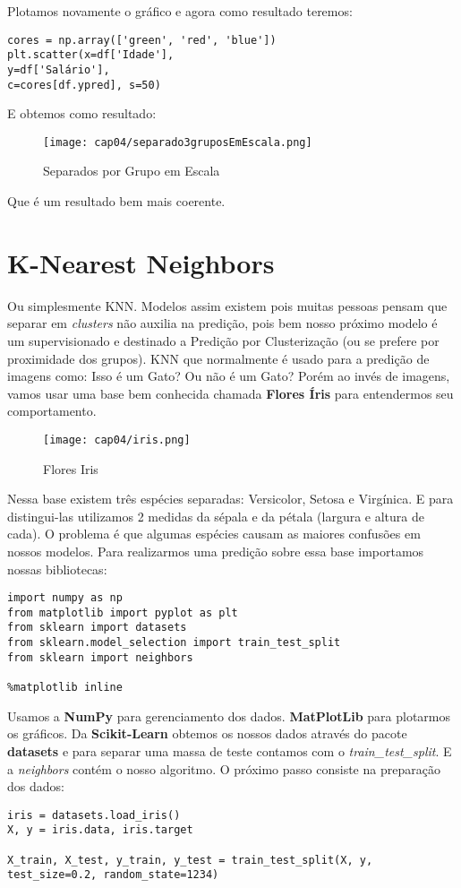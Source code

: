 Plotamos novamente o gráfico e agora como resultado teremos:
\begin{lstlisting}[]
cores = np.array(['green', 'red', 'blue'])
plt.scatter(x=df['Idade'],
y=df['Salário'],
c=cores[df.ypred], s=50)
\end{lstlisting}

E obtemos como resultado:
\begin{figure}[H]
	\centering
	\texttt{[image: cap04/separado3gruposEmEscala.png]}
	\caption{Separados por Grupo em Escala}
\end{figure}

Que é um resultado bem mais coerente.

\section{K-Nearest Neighbors}
Ou simplesmente KNN. Modelos assim existem pois muitas pessoas pensam que separar em \textit{clusters} não auxilia na predição, pois bem nosso próximo modelo é um supervisionado e destinado a Predição por Clusterização (ou se prefere por proximidade dos grupos). KNN que normalmente é usado para a predição de imagens como: Isso é um Gato? Ou não é um Gato? Porém ao invés de imagens, vamos usar uma base bem conhecida chamada \textbf{Flores Íris} para entendermos seu comportamento. 
\begin{figure}[H]
	\centering
	\texttt{[image: cap04/iris.png]}
	\caption{Flores Iris}
\end{figure}

Nessa base existem três espécies separadas: Versicolor, Setosa e Virgínica. E para distingui-las utilizamos 2 medidas da sépala e da pétala (largura e altura de cada). O problema é que algumas espécies causam as maiores confusões em nossos modelos. Para realizarmos uma predição sobre essa base importamos nossas bibliotecas:
\begin{lstlisting}[]
import numpy as np
from matplotlib import pyplot as plt
from sklearn import datasets
from sklearn.model_selection import train_test_split
from sklearn import neighbors

%matplotlib inline
\end{lstlisting}

Usamos a \textbf{NumPy} para gerenciamento dos dados. \textbf{MatPlotLib} para plotarmos os gráficos. Da \textbf{Scikit-Learn} obtemos os nossos dados através do pacote \textbf{datasets} e para separar uma massa de teste contamos com o \textit{train\_test\_split}. E a \textit{neighbors} contém o nosso algoritmo. O próximo passo consiste na preparação dos dados:
\begin{lstlisting}[]
iris = datasets.load_iris()
X, y = iris.data, iris.target

X_train, X_test, y_train, y_test = train_test_split(X, y, test_size=0.2, random_state=1234)
\end{lstlisting}

